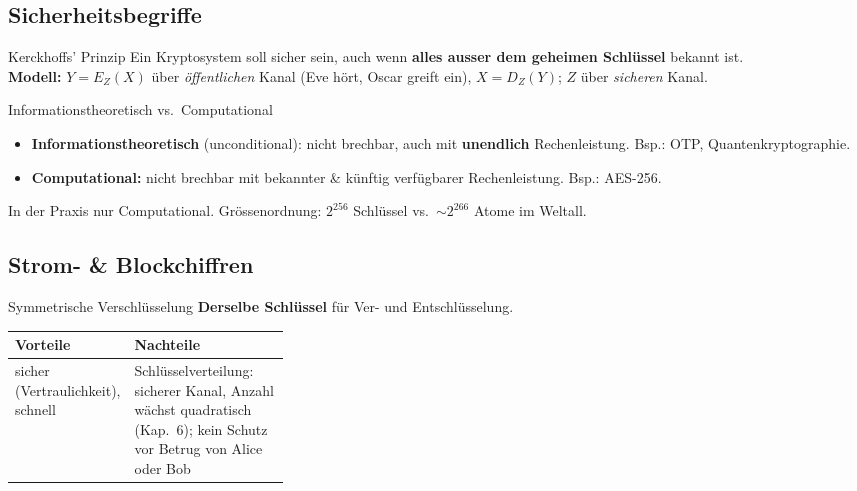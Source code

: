 \documentclass[a4paper, fontsize=7pt]{scrartcl}
\renewcommand*{\arraystretch}{1.5}  %
\begin{document}
\subsection{Sicherheitsbegriffe}

\begin{mainbox}{Kerckhoffs' Prinzip}
Ein Kryptosystem soll sicher sein, auch wenn \textbf{alles ausser dem geheimen
Schlüssel} bekannt ist.\\
\textbf{Modell:} $Y = E_Z(X)$ über \emph{öffentlichen} Kanal (Eve hört, Oscar
greift ein), $X = D_Z(Y)$; $Z$ über \emph{sicheren} Kanal.
\end{mainbox}

\begin{mainbox}{Informationstheoretisch vs.\ Computational}
\begin{itemize}
    \item \textbf{Informationstheoretisch} (unconditional): nicht brechbar, auch
          mit \textbf{unendlich} Rechenleistung. Bsp.: OTP, Quantenkryptographie.
    \item \textbf{Computational:} nicht brechbar mit bekannter \& künftig
          verfügbarer Rechenleistung. Bsp.: AES-256.
\end{itemize}
In der Praxis nur Computational. Grössenordnung: $2^{256}$ Schlüssel vs.\
$\sim 2^{266}$ Atome im Weltall.
\end{mainbox}

\subsection{Strom- \& Blockchiffren}

\begin{mainbox}{Symmetrische Verschlüsselung}
\textbf{Derselbe Schlüssel} für Ver- und Entschlüsselung.
\renewcommand*{\arraystretch}{1.15}
\begin{tabularx}{\linewidth}{@{}>{\raggedright\arraybackslash}p{0.32\linewidth}|>{\raggedright\arraybackslash}X@{}}
\textbf{Vorteile} & \textbf{Nachteile} \\
\hline
sicher (Vertraulichkeit), schnell & Schlüsselverteilung: sicherer Kanal, Anzahl
  wächst quadratisch (Kap.\ 6); kein Schutz vor Betrug von Alice oder Bob \\
\end{tabularx}
\end{mainbox}
\end{document}

